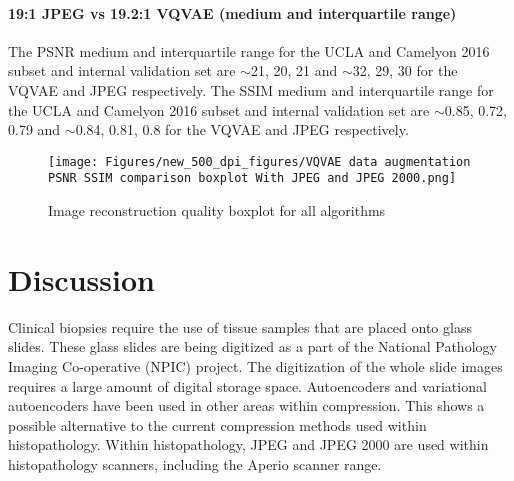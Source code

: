 \documentclass[review]{elsarticle}
\begin{document}


\paragraph{19:1 JPEG vs 19.2:1 VQVAE (medium and interquartile range)} The PSNR medium and interquartile range for the UCLA and Camelyon 2016 subset and internal validation set are $\sim$21, 20, 21 and $\sim$32, 29, 30 for the VQVAE and JPEG respectively.
The SSIM medium and interquartile range for the UCLA and Camelyon 2016 subset and internal validation set are $\sim$0.85, 0.72, 0.79 and $\sim$0.84, 0.81, 0.8 for the VQVAE and JPEG respectively.

\begin{figure}
\texttt{[image: Figures/new\_500\_dpi\_figures/VQVAE data augmentation PSNR SSIM comparison boxplot With JPEG and JPEG 2000.png]}
\caption{Image reconstruction quality boxplot for all algorithms}
\label{fig:image_reconstruction_quality_boxplot_for_all_algorithms}
\end{figure}
 
\section{Discussion}
Clinical biopsies require the use of tissue samples that are placed onto glass slides. These glass slides are being digitized as a part of the National Pathology Imaging Co-operative (NPIC) project. The digitization of the whole slide images requires a large amount of digital storage space. Autoencoders and variational autoencoders have been used in other areas within compression. This shows a possible alternative to the current compression methods used within histopathology. Within histopathology, JPEG and JPEG 2000 are used within histopathology scanners, including the Aperio scanner range.
\end{document}
